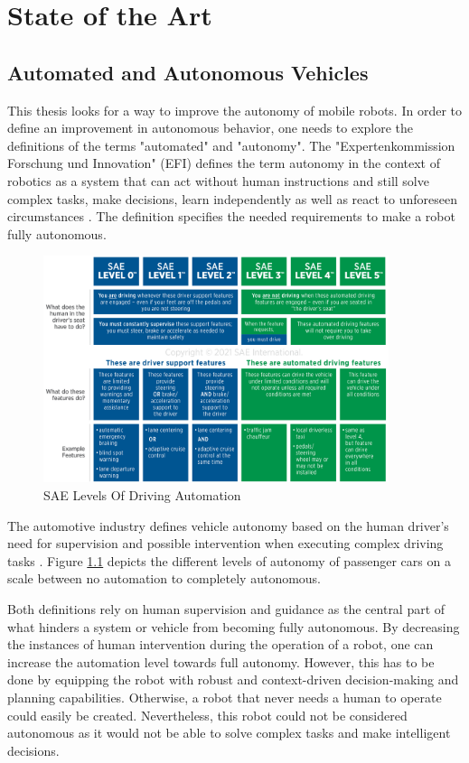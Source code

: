 \chapter{State of the Art}
\label{cha:state of the art}

\section{Automated and Autonomous Vehicles}

This thesis looks for a way to improve the autonomy of mobile robots. In order to define an improvement in autonomous behavior, one needs to explore the definitions of the terms "automated" and "autonomy". The "Expertenkommission Forschung und Innovation" (EFI) defines the term autonomy in the context of robotics as a system that can act without human instructions and still solve complex tasks, make decisions, learn independently as well as react to unforeseen circumstances \cite{efi2018}. The definition specifies the needed requirements to make a robot fully autonomous.

\begin{figure}[ht]
	\centering
	\includegraphics[width=0.9\textwidth]{images/j3016graphic_2021.png}
	\caption{SAE Levels Of Driving Automation \cite{J3016_202104}}
	\label{fig:sae_levels}
\end{figure}

The automotive industry defines vehicle autonomy based on the human driver's need for supervision and possible intervention when executing complex driving tasks \cite{J3016_202104}. Figure \ref{fig:sae_levels} depicts the different levels of autonomy of passenger cars on a scale between no automation to completely autonomous. 

Both definitions rely on human supervision and guidance as the central part of what hinders a system or vehicle from becoming fully autonomous. By decreasing the instances of human intervention during the operation of a robot, one can increase the automation level towards full autonomy. However, this has to be done by equipping the robot with robust and context-driven decision-making and planning capabilities. Otherwise, a robot that never needs a human to operate could easily be created. Nevertheless, this robot could not be considered autonomous as it would not be able to solve complex tasks and make intelligent decisions.

